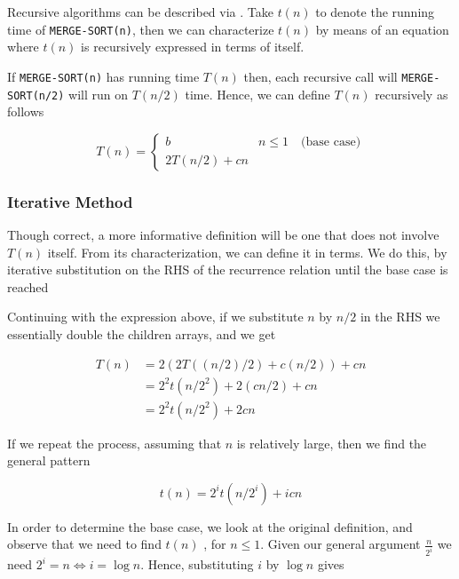 	

\par{Recursive algorithms can be described via . Take
$t(n)$ to denote the  running time of \texttt{MERGE-SORT(n)},
then we can characterize $t(n)$ by means of an equation where $t(n)$ is
recursively expressed in terms of itself.
}
\par{If \texttt{MERGE-SORT(n)} has running time $T(n)$ then, each recursive call
will \texttt{MERGE-SORT(n/2)} will run on $T(n/2)$ time. Hence, we can define
$T(n)$ recursively as follows}

$$ T(n) = \left\{ 
	\begin{array}{ll}
		b & n \leq 1 \quad \text{(base case)} \\
		2T(n/2) + cn 
	\end{array}
\right.
$$
\subsubsection{Iterative Method}
\par{Though correct, a more informative definition will be one that does not
involve $T(n)$ itself. From its  characterization, we can
define it in  terms. We do this, by iterative substitution on the
RHS of the recurrence relation until the base case is reached}
\par{Continuing with the expression above, if we substitute $n$ by $n/2$ in the RHS we
essentially double the children arrays, and we get}

\begin{align*}
	T(n) &= 2(2T((n/2)/2) + c(n/2)) + cn \\
		&= 2^2t(n/2^2) + 2(cn/2) + cn \\
		&= 2^2t(n/2^2) + 2cn
\end{align*}

\par{If we repeat the process, assuming that $n$ is relatively large, then we
find the general pattern}

$$t(n) = 2^it(n/2^i) +  icn$$

\par{In order to determine the base case, we look at the original definition,
and observe that  we need to find $t(n)$ , for $n \leq 1$. Given our general
argument $\frac{n}{2^i}$ we need $2^i = n \iff i = \log n$. Hence, substituting
$i$ by $ \log n$ gives}

